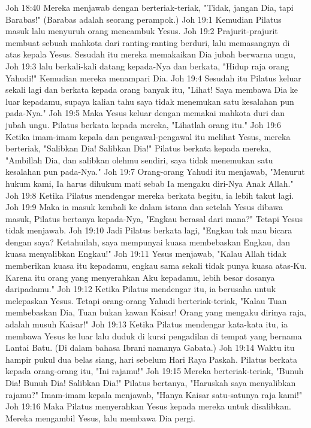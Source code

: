 Joh 18:40  Mereka menjawab dengan berteriak-teriak, "Tidak, jangan Dia, tapi Barabas!" (Barabas adalah seorang perampok.)
Joh 19:1  Kemudian Pilatus masuk lalu menyuruh orang mencambuk Yesus.
Joh 19:2  Prajurit-prajurit membuat sebuah mahkota dari ranting-ranting berduri, lalu memasangnya di atas kepala Yesus. Sesudah itu mereka memakaikan Dia jubah berwarna ungu,
Joh 19:3  lalu berkali-kali datang kepada-Nya dan berkata, "Hidup raja orang Yahudi!" Kemudian mereka menampari Dia.
Joh 19:4  Sesudah itu Pilatus keluar sekali lagi dan berkata kepada orang banyak itu, "Lihat! Saya membawa Dia ke luar kepadamu, supaya kalian tahu saya tidak menemukan satu kesalahan pun pada-Nya."
Joh 19:5  Maka Yesus keluar dengan memakai mahkota duri dan jubah ungu. Pilatus berkata kepada mereka, "Lihatlah orang itu."
Joh 19:6  Ketika imam-imam kepala dan pengawal-pengawal itu melihat Yesus, mereka berteriak, "Salibkan Dia! Salibkan Dia!" Pilatus berkata kepada mereka, "Ambillah Dia, dan salibkan olehmu sendiri, saya tidak menemukan satu kesalahan pun pada-Nya."
Joh 19:7  Orang-orang Yahudi itu menjawab, "Menurut hukum kami, Ia harus dihukum mati sebab Ia mengaku diri-Nya Anak Allah."
Joh 19:8  Ketika Pilatus mendengar mereka berkata begitu, ia lebih takut lagi.
Joh 19:9  Maka ia masuk kembali ke dalam istana dan setelah Yesus dibawa masuk, Pilatus bertanya kepada-Nya, "Engkau berasal dari mana?" Tetapi Yesus tidak menjawab.
Joh 19:10  Jadi Pilatus berkata lagi, "Engkau tak mau bicara dengan saya? Ketahuilah, saya mempunyai kuasa membebaskan Engkau, dan kuasa menyalibkan Engkau!"
Joh 19:11  Yesus menjawab, "Kalau Allah tidak memberikan kuasa itu kepadamu, engkau sama sekali tidak punya kuasa atas-Ku. Karena itu orang yang menyerahkan Aku kepadamu, lebih besar dosanya daripadamu."
Joh 19:12  Ketika Pilatus mendengar itu, ia berusaha untuk melepaskan Yesus. Tetapi orang-orang Yahudi berteriak-teriak, "Kalau Tuan membebaskan Dia, Tuan bukan kawan Kaisar! Orang yang mengaku dirinya raja, adalah musuh Kaisar!"
Joh 19:13  Ketika Pilatus mendengar kata-kata itu, ia membawa Yesus ke luar lalu duduk di kursi pengadilan di tempat yang bernama Lantai Batu. (Di dalam bahasa Ibrani namanya Gabata.)
Joh 19:14  Waktu itu hampir pukul dua belas siang, hari sebelum Hari Raya Paskah. Pilatus berkata kepada orang-orang itu, "Ini rajamu!"
Joh 19:15  Mereka berteriak-teriak, "Bunuh Dia! Bunuh Dia! Salibkan Dia!" Pilatus bertanya, "Haruskah saya menyalibkan rajamu?" Imam-imam kepala menjawab, "Hanya Kaisar satu-satunya raja kami!"
Joh 19:16  Maka Pilatus menyerahkan Yesus kepada mereka untuk disalibkan. Mereka mengambil Yesus, lalu membawa Dia pergi.
